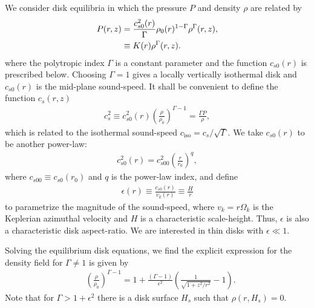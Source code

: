We consider disk equilibria in which the pressure $P$ and density
$\rho$ are related by   
\begin{align}
  P(r,z) &= 
  \frac{c_{s0}^2(r)}{\Gamma}\rho_0(r)^{1-\Gamma}\rho^\Gamma(r,z),\notag\\
  & \equiv K(r)\rho^{\Gamma}(r,z). \label{eqm_press}
\end{align}
where the polytropic index $\Gamma$ is a  constant parameter  and the
function $c_{s0}(r)$ is prescribed below. Choosing $\Gamma=1$ gives  a 
locally vertically isothermal disk and $c_{s0}(r)$ is the mid-plane
sound-speed. 
It shall be convenient to define the function $c_s(r,z)$ 
\begin{align}
  c_s^2\equiv %
  c_{s0}^2(r)\left(\frac{\rho}{\rho_0}\right)^{\Gamma-1} =
  \frac{\Gamma P}{\rho}, 
\end{align}
which is related to the isothermal sound-speed $c_\mathrm{iso} =
c_s/\sqrt{\Gamma}$. We take $c_{s0}(r)$ to be another power-law:  
\begin{align}
  c_{s0}^2(r)=c_{s00}^2\left(\frac{r}{r_0}\right)^q, 
\end{align}
where $c_{s00}\equiv c_{s0}(r_0)$  and $q$ is the power-law index, and
define   
\begin{align}
  \epsilon(r) \equiv \frac{c_{s0}(r)}{v_k(r)} \equiv
  \frac{H}{r} 
\end{align}
to parametrize the magnitude of the sound-speed, where
$v_k=r\Omega_k$ is the Keplerian azimuthal velocity and
$H$ is a characteristic scale-height.  Thus, $\epsilon$
is also a characteristic disk aspect-ratio. We are 
interested in thin disks with $\epsilon \ll 1$.%




Solving the equilibrium disk equations, we find the explicit
expression for the density field for 
$\Gamma\neq1$ is given  by
\begin{align}\label{eqm_dens}
  &\left(\frac{\rho}{\rho_0}\right)^{\Gamma-1} = 1 +
  \frac{\left(\Gamma-1\right)}{\epsilon^2}\left(\frac{1}{\sqrt{1+z^2/r^2}}-1\right).
\end{align}
Note that for $\Gamma > 1 + \epsilon^2$ there is a disk surface $H_s$
such that $\rho(r,H_s)=0$. 

